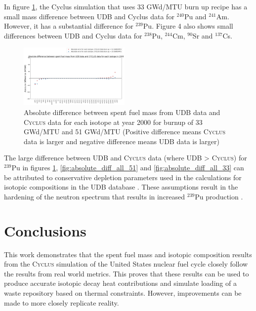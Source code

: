 \documentclass{anstrans}
\newcommand{\Cyclus}{\textsc{Cyclus}\xspace}%
\begin{document}
In figure \ref{fig:absolute_diff_2000}, the Cyclus simulation that uses 33 GWd/MTU burn up recipe has a small mass difference between UDB and Cyclus data for $^{240}$Pu and $^{241}$Am. However, it has a substantial difference for $^{239}$Pu. Figure 4 also shows small differences between UDB and Cyclus data for $^{238}$Pu, $^{244}$Cm, $^{90}$Sr and $^{137}$Cs. 

\begin{figure}[h] %
	\centering
	\includegraphics[width=0.48\textwidth]{absolute_diff_2000}
	\caption{Absolute difference between spent fuel mass from UDB data and \Cyclus data for each isotope at year 2000 for burnup of 33 GWd/MTU and 51 GWd/MTU (Positive difference means \Cyclus data is larger and negative difference means UDB data is larger)}
	\label{fig:absolute_diff_2000}
\end{figure} 

The large difference between UDB and \Cyclus data (where UDB > \Cyclus) for $^{239}$Pu in figures \ref{fig:absolute_diff_2000}, \ref{fig:absolute_diff_all_51} and \ref{fig:absolute_diff_all_33} can be attributed to conservative depletion parameters used in the calculations for isotopic compositions in the UDB database \cite{peterson_additional_2017}. These assumptions result in the hardening of the neutron spectrum that results in increased $^{239}$Pu production \cite{peterson_additional_2017}. 

\section{Conclusions}
This work demonstrates that the spent fuel mass and isotopic composition results from the \Cyclus simulation of the United States nuclear fuel cycle closely follow the results from real world metrics. This proves that these results can be used to produce accurate isotopic decay heat contributions and simulate loading of a waste repository based on thermal constraints. However, improvements can be made to more closely replicate reality.  
\end{document}
